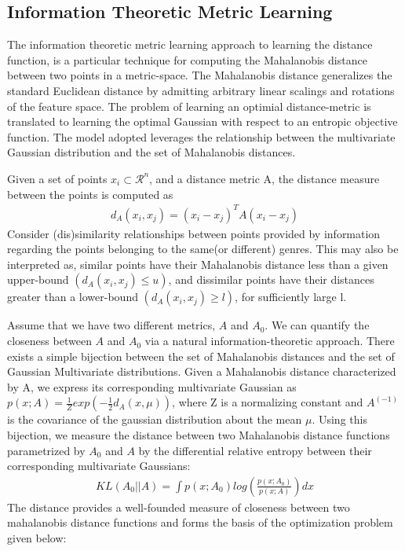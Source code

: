 \documentclass[12pt]{article}
\begin{document}
\subsection{Information Theoretic Metric Learning}

The information theoretic metric learning \cite{infoTheoryMetricLearning} approach to learning the distance function, is a particular technique for computing the Mahalanobis distance between two points in a metric-space. The Mahalanobis distance generalizes the standard Euclidean distance by admitting arbitrary linear scalings and rotations of the feature space. The problem of learning an optimial distance-metric is translated to learning the optimal Gaussian with respect to an entropic objective function. The model adopted leverages the relationship between the multivariate Gaussian distribution and the set of Mahalanobis distances. 

Given a set of points ${x_i} \subset \mathcal{R}^n$, and a distance metric A, the distance measure between the points is computed as
\begin{align*}
d_A(x_i,x_j) = (x_i - x_j)^TA(x_i - x_j)
\end{align*}Consider (dis)similarity relationships between points provided by information regarding the points belonging to the same(or different) genres. This may also be interpreted as, similar points have their Mahalanobis distance less than a given upper-bound $(d_A(x_i,x_j) \leq u)$, and dissimilar points have their distances greater than a lower-bound $(d_A(x_i,x_j) \geq l)$, for sufficiently large l. 

Assume that we have two different metrics, $A$ and $A_0$. We can quantify the closeness between $A$ and $A_0$ via a natural information-theoretic approach. There exists a simple bijection between the set of Mahalanobis distances and the set of Gaussian Multivariate distributions. Given a Mahalanobis distance characterized by A, we express its corresponding multivariate Gaussian as $p(x;A) = \frac{1}{Z} exp( - \frac{1}{2}d_A(x,\mu))$, where Z is a normalizing constant and $A^(-1)$ is the covariance of the gaussian distribution about the mean $\mu$. Using this bijection, we measure the distance between two Mahalanobis distance functions parametrized by $A_0$ and $A$ by the differential relative entropy between their corresponding multivariate Gaussians:
\begin{align}
KL(A_0||A) = \int p(x;A_0) log( \frac{p(x;A_0)}{p(x;A)}) dx
\end{align}
The distance provides a well-founded measure of closeness between two mahalanobis distance functions and forms the basis  of the optimization problem given below:
\end{document}
